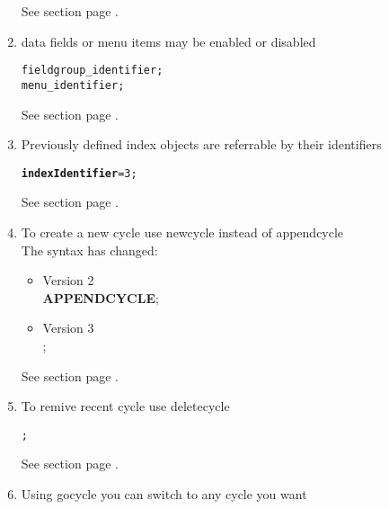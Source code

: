 \begin{enumerate}
See section  page \pageref{key:map}. \\
\item data fields or menu items may be enabled or disabled

\begin{boxedminipage}[t]{\linewidth}
\begin{alltt}
  \ENABLE{} fieldgroup_identifier;
  \DISABLE{} menu_identifier;
\end{alltt}
\end{boxedminipage}

See section  page \pageref{key:map}. \\
\item Previously defined index objects are referrable by their identifiers

\begin{boxedminipage}[t]{\linewidth}
\begin{alltt}
  {\bfseries indexIdentifier} = 3;
\end{alltt}
\end{boxedminipage}

See section  page \pageref{key:map}. \\
\item To create a new cycle use newcycle instead of appendcycle\\
The syntax has changed:
\begin{itemize}
\item Version 2 \\
  {\bfseries APPENDCYCLE};
\item Version 3 \\
  \NEWCYCLE;
\end{itemize}
See section  page \pageref{fucyclestatements}. \\
\item To remive recent cycle use deletecycle

\begin{boxedminipage}[t]{\linewidth}
\begin{alltt}
  \DELETECYCLE;
\end{alltt}
\end{boxedminipage}

See section  page \pageref{fucyclestatements}. \\
\item Using gocycle you can switch to any cycle you want


\end{enumerate}
